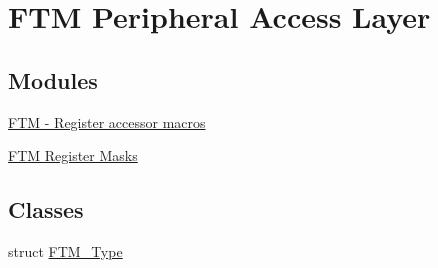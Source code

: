 \hypertarget{group__FTM__Peripheral__Access__Layer}{}\section{F\+TM Peripheral Access Layer}
\label{group__FTM__Peripheral__Access__Layer}
\subsection*{Modules}
\begin{DoxyCompactItemize}
\item 
\hyperlink{group__FTM__Register__Accessor__Macros}{F\+T\+M -\/ Register accessor macros}
\item 
\hyperlink{group__FTM__Register__Masks}{F\+T\+M Register Masks}
\end{DoxyCompactItemize}
\subsection*{Classes}
\begin{DoxyCompactItemize}
\item 
struct \hyperlink{structFTM__Type}{F\+T\+M\+\_\+\+Type}
\end{DoxyCompactItemize}
